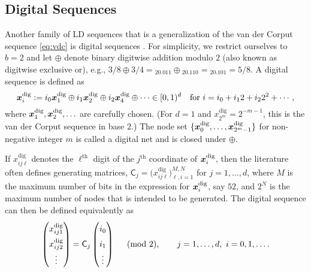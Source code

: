 \documentclass{svproc}
\begin{document}

\subsection{Digital Sequences} \label{sec:digital}

Another family of LD sequences that is a generalization of the van der Corput sequence \eqref{eq:vdc} is digital sequences \cite{DicPil10a,Nie92}.  For simplicity, we restrict ourselves to $b = 2$ and let $\oplus$ denote binary digitwise addition modulo $2$ (also known as digitwise exclusive or), e.g., $3/8 \oplus 3/4 = {}_20.011 \oplus {}_20.110 = {}_20.101 = 5/8$.  A digital sequence is defined as
\begin{equation} \label{eq:digital}
	{\boldsymbol{x}}_i^{\text{dig}} := i_0 {\boldsymbol{x}}^{\text{dig}} _1 \oplus i_1 {\boldsymbol{x}}^{\text{dig}}_2 \oplus i_2 {\boldsymbol{x}}^{\text{dig}} _4 \oplus \cdots \in [0,1)^d \quad \text{for }
	i = i_0 + i_12 + i_2 2^2 + \cdots,
\end{equation}
where ${\boldsymbol{x}}^{\text{dig}}_1, {\boldsymbol{x}}^{\text{dig}}_2, \ldots$ are carefully chosen.  (For $d=1$ and $x^{\text{dig}}_{2^m} = 2^{-m-1}$, this is the van  der Corput sequence in base $2$.) The node set $\{ {\boldsymbol{x}}^{\text{dig}}_0, \ldots, {\boldsymbol{x}}^{\text{dig}}_{2^m-1}\}$  for non-negative integer $m$ is called a digital net and is closed under $\oplus$.

If $x^{\text{dig}}_{ij\ell}$ denotes the $\ell^{\text{th}}$ digit of the $j^{\text{th}}$ coordinate of ${\boldsymbol{x}}^{\text{dig}}_i$, then the literature often defines generating matrices, $\mathsf{C}_j = \bigl(x^{\text{dig}}_{ij\ell}\bigr)_{\ell,i = 1}^{M,N}$ for $j = 1, \ldots, d$, where $M$ is the maximum number of bits in the expression for ${\boldsymbol{x}}^{\text{dig}}_i$, say $52$, and $2^N$ is the maximum number of nodes that is intended to be generated.  The digital sequence can then be defined equivalently as
\begin{equation} \label{eq:digitalB}
\renewcommand{\arraystretch}{1.5}
	\begin{pmatrix} x^{\text{dig}}_{ij1} \\ x^{\text{dig}}_{ij2} \\ \vdots \end{pmatrix}
	= \mathsf{C}_j \begin{pmatrix} i_0 \\ i_1 \\ \vdots \end{pmatrix}
    \quad \pmod{2}, \qquad j = 1,\ldots, d, \ i = 0, 1, \ldots.
\end{equation}
\end{document}
